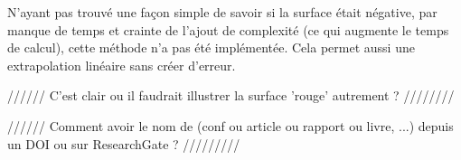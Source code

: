 N'ayant pas trouvé une façon simple de savoir si la surface était négative, par manque de temps et crainte de l'ajout de complexité (ce qui augmente le temps de calcul), cette méthode n'a pas été implémentée.
Cela permet aussi une extrapolation linéaire sans créer d'erreur.




////// C'est clair ou il faudrait illustrer la surface 'rouge' autrement ? ////////

////// Comment avoir le nom de (conf ou article ou rapport ou livre, ...) depuis un DOI ou sur ResearchGate ? /////////

